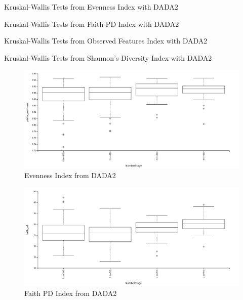 \documentclass[a4paper]{article}
\begin{document}
            \begin{table}[p]
                \centering
                \caption{Kruskal-Wallis Tests from Evenness Index with DADA2}
                \label{tb:alpha-evenness-dada2}
            \end{table}

            \begin{table}[p]
                \centering
                \caption{Kruskal-Wallis Tests from Faith PD Index with DADA2}
                \label{tb:alpha-faith-dada2}
            \end{table}

            \begin{table}[p]
                \centering
                \caption{Kruskal-Wallis Tests from Observed Features Index with DADA2}
                \label{tb:alpha-observed-dada2}
            \end{table}

            \begin{table}[p]
                \centering
                \caption{Kruskal-Wallis Tests from Shannon's Diversity Index with DADA2}
                \label{tb:alpha-shannon-dada2}
            \end{table}

            \begin{figure}[p]
                \centering
                \includegraphics[width=0.8 \linewidth]{figures/AlphaDiversity/DADA2/evenness.png}
                \caption{Evenness Index from DADA2}
                \label{fig:evenness-dada2}
            \end{figure}

            \begin{figure}[p]
                \centering
                \includegraphics[width=0.8 \linewidth]{figures/AlphaDiversity/DADA2/faith.png}
                \caption{Faith PD Index from DADA2}
                \label{fig:faith-dada2}
            \end{figure}
\end{document}
